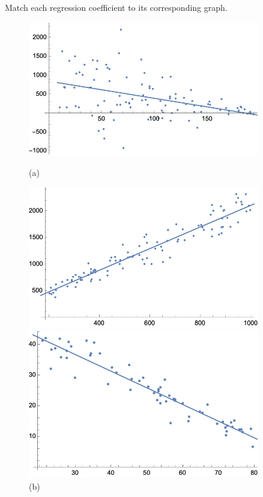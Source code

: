 \documentclass[11pt,letterpaper]{article}
\begin{document}
\newpage





 Match each regression coefficient to its corresponding graph. 
	\begin{figure}[!ht]
	\centering
	\begin{minipage}{0.45\textwidth}
	   \centering
	   \includegraphics[width=0.9\textwidth]{reg1.png}
	   \caption*{(a)}
	\end{minipage}\hfill
	\begin{minipage}{0.45\textwidth}
	   \centering
	   \includegraphics[width=0.9\textwidth]{reg2.png}
	   \caption*{(b)}
	\end{minipage}
	\begin{minipage}{0.45\textwidth}
	   \centering
	   \includegraphics[width=0.9\textwidth]{reg3.png}

\end{minipage}
\end{figure}
\end{document}
